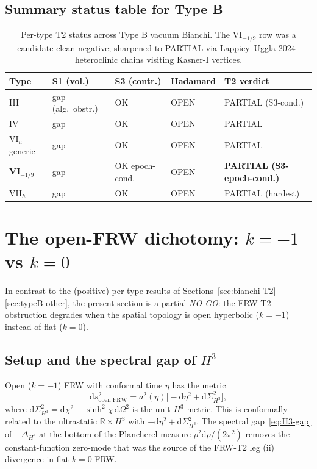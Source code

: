\documentclass[11pt]{article}
\theoremstyle{definition}
\newcommand{\R}{\mathbb{R}}
\begin{document}
\subsection{Summary status table for Type B}\label{sec:typeB-summary}

\begin{table}[ht]
\centering
\begin{tabular}{|l|l|l|l|l|}
\hline
Type & S1 (vol.) & S3 (contr.) & Hadamard & T2 verdict \\
\hline
III & gap (alg.\ obstr.) & OK & OPEN & PARTIAL (S3-cond.) \\
IV & gap & OK & OPEN & PARTIAL \\
VI$_h$ generic & gap & OK & OPEN & PARTIAL \\
\textbf{VI$_{-1/9}$} & gap & OK epoch-cond. & OPEN & \textbf{PARTIAL (S3-epoch-cond.)} \\
VII$_h$ & gap & OK & OPEN & PARTIAL (hardest) \\
\hline
\end{tabular}
\caption{Per-type T2 status across Type B vacuum Bianchi. The $\mathrm{VI}_{-1/9}$ row was a candidate clean negative; sharpened to PARTIAL via Lappicy--Uggla 2024~\cite{LappicyUggla2024} heteroclinic chains visiting Kasner-I vertices.}
\label{tab:typeB-summary}
\end{table}

\section{\texorpdfstring{The open-FRW dichotomy: $k=-1$ vs $k=0$}{The open-FRW dichotomy: k=-1 vs k=0}}\label{sec:openFRW}

In contrast to the (positive) per-type results of Sections~\ref{sec:bianchi-T2}--\ref{sec:typeB-other}, the present section is a partial \emph{NO-GO}: the FRW T2 obstruction degrades when the spatial topology is open hyperbolic ($k=-1$) instead of flat ($k=0$).

\subsection{\texorpdfstring{Setup and the spectral gap of $H^3$}{Setup and the spectral gap of H3}}\label{sec:openFRW-setup}

Open ($k=-1$) FRW with conformal time $\eta$ has the metric
\begin{equation*}
\mathrm{d}s^2_{\text{open FRW}} = a^2(\eta)\bigl[-\mathrm{d}\eta^2 + \mathrm{d}\Sigma_{H^3}^2\bigr],
\end{equation*}
where $\mathrm{d}\Sigma_{H^3}^2 = \mathrm{d}\chi^2 + \sinh^2\chi\,\mathrm{d}\Omega^2$ is the unit $H^3$ metric. This is conformally related to the ultrastatic $\R\times H^3$ with $-\mathrm{d}\eta^2 + \mathrm{d}\Sigma_{H^3}^2$. The spectral gap~\eqref{eq:H3-gap} of $-\Delta_{H^3}$ at the bottom of the Plancherel measure $\rho^2\mathrm{d}\rho/(2\pi^2)$ removes the constant-function zero-mode that was the source of the FRW-T2 leg (ii) divergence in flat $k=0$ FRW.
\end{document}
